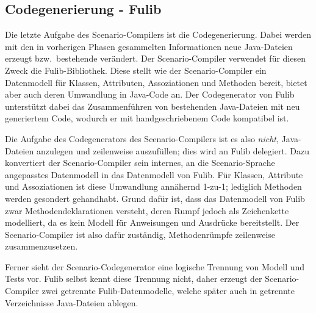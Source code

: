 

\subsection{Codegenerierung - Fulib}\label{subsec:codegen-fulib}

Die letzte Aufgabe des Scenario-Compilers ist die Codegenerierung.
Dabei werden mit den in vorherigen Phasen gesammelten Informationen neue Java-Dateien erzeugt bzw.\ bestehende verändert.
Der Scenario-Compiler verwendet für diesen Zweck die Fulib\cite{fulib}-Bibliothek.
Diese stellt wie der Scenario-Compiler ein Datenmodell für Klassen, Attributen, Assoziationen und Methoden bereit,
bietet aber auch deren Umwandlung in Java-Code an.
Der Codegenerator von Fulib unterstützt dabei das Zusammenführen von bestehenden Java-Dateien mit neu generiertem Code,
wodurch er mit handgeschriebenem Code kompatibel ist.

Die Aufgabe des Codegenerators des Scenario-Compilers ist es also \emph{nicht},
Java-Dateien anzulegen und zeilenweise auszufüllen;
dies wird an Fulib delegiert.
Dazu konvertiert der Scenario-Compiler sein internes, an die Scenario-Sprache angepasstes Datenmodell in das Datenmodell von Fulib.
Für Klassen, Attribute und Assoziationen ist diese Umwandlung annähernd 1-zu-1;
lediglich Methoden werden gesondert gehandhabt.
Grund dafür ist, dass das Datenmodell von Fulib zwar Methodendeklarationen versteht,
deren Rumpf jedoch als Zeichenkette modelliert,
da es kein Modell für Anweisungen und Ausdrücke bereitstellt.
Der Scenario-Compiler ist also dafür zuständig, Methodenrümpfe zeilenweise zusammenzusetzen.

Ferner sieht der Scenario-Codegenerator eine logische Trennung von Modell und Tests vor.
Fulib selbst kennt diese Trennung nicht, daher erzeugt der Scenario-Compiler zwei getrennte Fulib-Datenmodelle, welche später auch in getrennte Verzeichnisse Java-Dateien ablegen.

